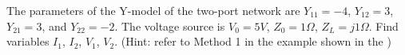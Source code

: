% 

\item The parameters of the Y-model of the two-port network are $Y_{11}=-4$, 
$Y_{12}=3$, $Y_{21}=3$, and $Y_{22}=-2$. The voltage source is $V_0=5V$, 
$Z_0=1\Omega$, $Z_L=j1\Omega$. Find variables $I_1$, $I_2$, $V_1$, $V_2$. 
(Hint: refer to Method 1 in the example shown in the
)



